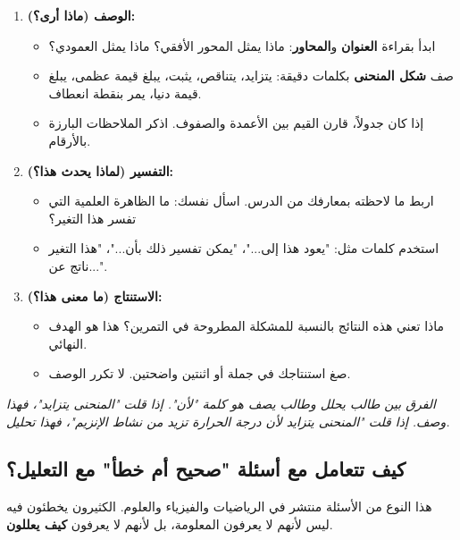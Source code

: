 \documentclass[12pt,a4paper]{book}
\newcommand{\quoteAr}[1]{%
	\begin{myquote}
		\itshape #1
	\end{myquote}
}
\begin{document}
	\begin{enumerate}
		\item \textbf{الوصف (ماذا أرى؟):}
		\begin{itemize}
			\item ابدأ بقراءة \textbf{العنوان} و\textbf{المحاور}: ماذا يمثل المحور الأفقي؟ ماذا يمثل العمودي؟
			\item صف \textbf{شكل المنحنى} بكلمات دقيقة: يتزايد، يتناقص، يثبت، يبلغ قيمة عظمى، يبلغ قيمة دنيا، يمر بنقطة انعطاف.
			\item إذا كان جدولاً، قارن القيم بين الأعمدة والصفوف. اذكر الملاحظات البارزة بالأرقام.
		\end{itemize}
		\item \textbf{التفسير (لماذا يحدث هذا؟):}
		\begin{itemize}
			\item اربط ما لاحظته بمعارفك من الدرس. اسأل نفسك: ما الظاهرة العلمية التي تفسر هذا التغير؟
			\item استخدم كلمات مثل: "يعود هذا إلى..."، "يمكن تفسير ذلك بأن..."، "هذا التغير ناتج عن...".
		\end{itemize}
		\item \textbf{الاستنتاج (ما معنى هذا؟):}
		\begin{itemize}
			\item ماذا تعني هذه النتائج بالنسبة للمشكلة المطروحة في التمرين؟ هذا هو الهدف النهائي.
			\item صغ استنتاجك في جملة أو اثنتين واضحتين. لا تكرر الوصف.
		\end{itemize}
	\end{enumerate}
	
	\quoteAr{الفرق بين طالب يحلل وطالب يصف هو كلمة "لأن". إذا قلت "المنحنى يتزايد"، فهذا وصف. إذا قلت "المنحنى يتزايد لأن درجة الحرارة تزيد من نشاط الإنزيم"، فهذا تحليل.}
	
	\subsection{كيف تتعامل مع أسئلة "صحيح أم خطأ" مع التعليل؟}
	\label{sec:true-false}
	
	هذا النوع من الأسئلة منتشر في الرياضيات والفيزياء والعلوم. الكثيرون يخطئون فيه ليس لأنهم لا يعرفون المعلومة، بل لأنهم لا يعرفون \textbf{كيف يعللون}.
	
\end{document}
